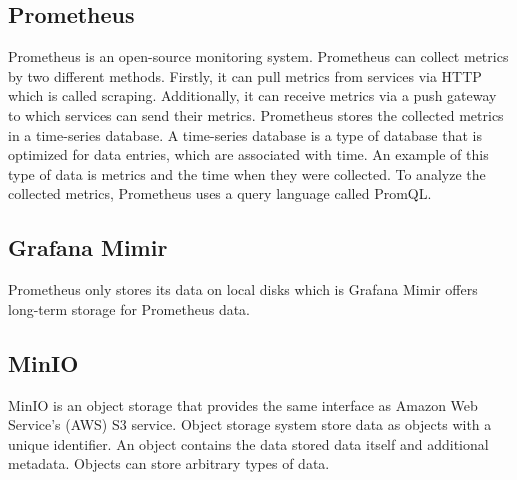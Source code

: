 \subsection{Prometheus}
Prometheus is an open-source monitoring system.
Prometheus can collect metrics by two different methods.
Firstly, it can pull metrics from services via HTTP which is called scraping.
Additionally, it can receive metrics via a push gateway to which services can send their metrics.
Prometheus stores the collected metrics in a time-series database.
A time-series database is a type of database that is optimized for data entries,
which are associated with time. An example of this type of data is metrics and the time when they were collected.
To analyze the collected metrics, Prometheus uses a query language called PromQL.

\subsection{Grafana Mimir}
Prometheus only stores its data on local disks which is
Grafana Mimir offers long-term storage for Prometheus data.

\subsection{MinIO}
MinIO is an object storage that provides the same interface as Amazon Web Service's (AWS) S3 service.
Object storage system store data as objects with a unique identifier. An object contains the data stored
data itself and additional metadata. Objects can store arbitrary types of data.

